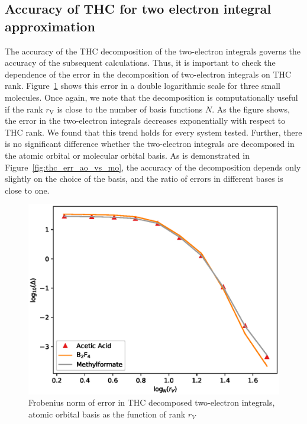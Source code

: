 \subsection{Accuracy of THC for two electron integral approximation}
The accuracy of the THC decomposition of the two-electron integrals governs the
accuracy of the subsequent calculations. Thus, it is important to 
check the dependence of the error in the decomposition of
two-electron integrals on THC rank. Figure~\ref{fig:thc_err_mo_3systems} 
shows this error in a double logarithmic scale for three small molecules. 
Once again, we note that the decomposition is computationally useful if the 
rank $r_\mathrm{V}$ is close to the number of basis functions $N$.  As the 
figure shows, the error in the two-electron integrals decreases exponentially 
with respect to THC rank. We found that this trend holds for every system
tested. Further, there is no significant difference whether the two-electron 
integrals are decomposed in the atomic orbital or molecular orbital basis. As 
is demonstrated in Figure~\ref{fig:thc_err_ao_vs_mo}, the accuracy of the 
decomposition depends only slightly on the choice of the basis, and the ratio 
of errors in different bases is close to one.
%
\begin{figure}[tb]
\includegraphics[width=\columnwidth]{figures/thc_rccsd/thc_err_mo_3systems}
\caption{Frobenius norm of error in THC decomposed two-electron integrals, 
atomic orbital basis as the function of rank $r_{V}$
\label{fig:thc_err_mo_3systems}}
\end{figure}
%
